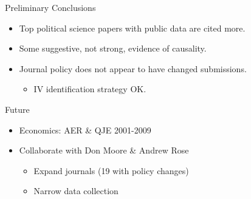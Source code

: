 \documentclass{beamer}
\begin{document}
\begin{frame}{Preliminary Conclusions}

  \begin{itemize}
  \item
    Top political science papers with public data are cited more.
  \item
    Some suggestive, not strong, evidence of causality.
  \item
    Journal policy does not appear to have changed submissions.
    \begin{itemize}
    \item IV identification strategy OK.
    \end{itemize}
  \end{itemize}
\end{frame}

\begin{frame}{Future}
	\begin{itemize}
	\item Economics: AER \& QJE 2001-2009
	\item Collaborate with Don Moore \& Andrew Rose
	\begin{itemize}
	\item Expand journals (19 with policy changes)
	\item Narrow data collection
	\end{itemize}
	\end{itemize}
\end{frame}
\end{document}
